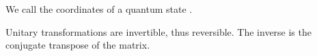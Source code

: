 \begin{remark}
  We call the coordinates of a quantum state .
\end{remark}

\begin{remark}
  Unitary transformations are invertible, thus reversible. The inverse
  is the conjugate transpose of the matrix.
\end{remark}





